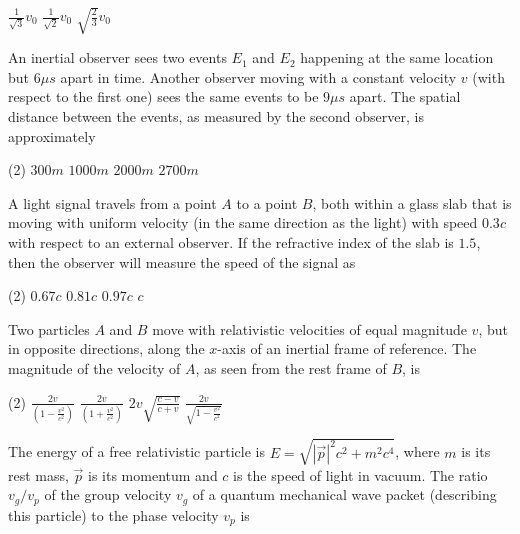 \begin{enumerate}
\begin{tasks}
	\task[\textbf{B.}]$\frac{1}{\sqrt{3}} v_{0}$
	\task[\textbf{C.}]$\frac{1}{\sqrt{2}} v_{0}$
	\task[\textbf{D.}]$\sqrt{\frac{2}{3}} v_{0}$
\end{tasks}
\begin{minipage}{\textwidth}
	\item An inertial observer sees two events $E_{1}$ and $E_{2}$ happening at the same location but $6 \mu s$ apart in time. Another observer moving with a constant velocity $v$ (with respect to the first one) sees the same events to be $9 \mu s$ apart. The spatial distance between the events, as measured by the second observer, is approximately
\end{minipage}
\begin{tasks}(2)
	\task[\textbf{A.}] $300 m$
	\task[\textbf{B.}]$1000 m$
	\task[\textbf{C.}]$2000 m$
	\task[\textbf{D.}]$2700 m$
\end{tasks}
\begin{minipage}{\textwidth}
	\item A light signal travels from a point $A$ to a point $B$, both within a glass slab that is moving with uniform velocity (in the same direction as the light) with speed $0.3 c$ with respect to an external observer. If the refractive index of the slab is $1.5$, then the observer will measure the speed of the signal as
\end{minipage}
\begin{tasks}(2)
	\task[\textbf{A.}] $0.67 c$
	\task[\textbf{B.}]$0.81 c$
	\task[\textbf{C.}]$0.97 c$
	\task[\textbf{D.}] $c$
\end{tasks}
\begin{minipage}{\textwidth}
	\item Two particles $A$ and $B$ move with relativistic velocities of equal magnitude $v$, but in opposite directions, along the $x$-axis of an inertial frame of reference. The magnitude of the velocity of $A$, as seen from the rest frame of $B$, is
\end{minipage}
\begin{tasks}(2)
	\task[\textbf{A.}] $\frac{2 v}{\left(1-\frac{v^{2}}{c^{2}}\right)}$ 
	\task[\textbf{B.}]$\frac{2 v}{\left(1+\frac{v^{2}}{c^{2}}\right)}$
	\task[\textbf{C.}] $2 v \sqrt{\frac{c-v}{c+v}}$ 
	\task[\textbf{D.}]$\frac{2 v}{\sqrt{1-\frac{v^{2}}{c^{2}}}}$
\end{tasks}
\begin{minipage}{\textwidth}
	\item The energy of a free relativistic particle is $E=\sqrt{|\vec{p}|^{2} c^{2}+m^{2} c^{4}}$, where $m$ is its rest mass, $\vec{p}$ is its momentum and $c$ is the speed of light in vacuum. The ratio $v_{g} / v_{p}$ of the group velocity $v_{g}$ of a quantum mechanical wave packet (describing this particle) to the phase velocity $v_{p}$ is

\end{minipage}
\end{enumerate}
